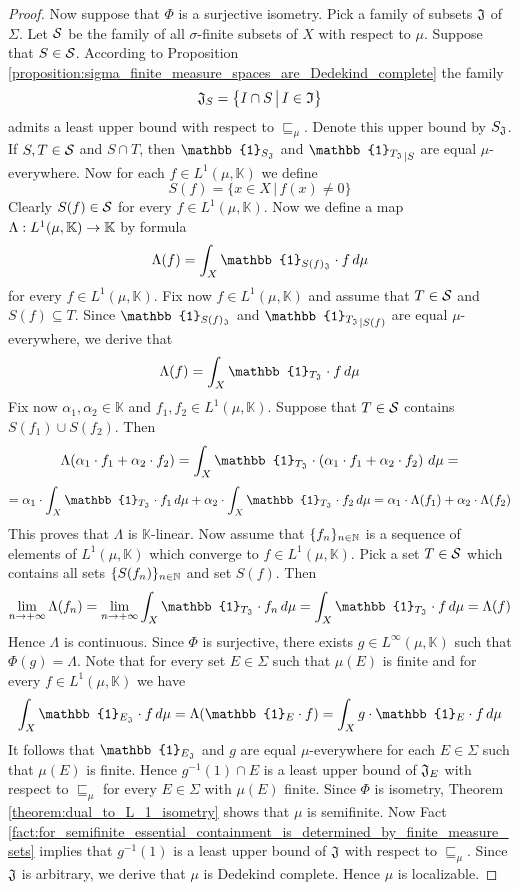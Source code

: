 \begin{proof}
  Now suppose that $\Phi$ is a surjective isometry. Pick a family of subsets ${\mathfrak J}$ of $\Sigma$. Let ${\mathcal S}$ be the family of all $\sigma$-finite subsets of $X$ with respect to $\mu$. Suppose that $S \in {\mathcal S}$. According to Proposition \ref{proposition:sigma_finite_measure_spaces_are_Dedekind_complete} the family
  $${\mathfrak J}_S = \big\{I\cap S\,\big|\,I\in {\mathfrak I}\big\}$$
  admits a least upper bound with respect to $\sqsubseteq_{\mu}$. Denote this upper bound by $S_{{\mathfrak J}}$. If $S,T \in {\mathcal S}$ and $S \cap T$, then $\mathbb{1}_{S_{\fJ}}$ and ${\mathbb{1}_{T_{\fJ}}}_{\mid S}$ are equal $\mu$-everywhere. Now for each $f \in L^1(\mu,\mathbb{K})$ we define
  $$S(f) = \big\{x\in X\,\big|\,f(x) \neq 0\big\}$$
  Clearly $S(f) \in {\mathcal S}$ for every $f \in L^1(\mu,\mathbb{K})$. Now we define a map $\Lambda:L^1(\mu,\mathbb{K})\rightarrow \mathbb{K}$ by formula
  $$\Lambda(f) = \int_X\mathbb{1}_{S(f)_{\fJ}}\cdot f\,d\mu$$
  for every $f \in L^1(\mu,\mathbb{K})$. Fix now $f \in L^1(\mu,\mathbb{K})$ and assume that $T \in {\mathcal S}$ and $S(f) \subseteq T$. Since $\mathbb{1}_{S(f)_{\fJ}}$ and ${\mathbb{1}_{T_{\fJ}}}_{\mid S(f)}$ are equal $\mu$-everywhere, we derive that
  $$\Lambda(f) = \int_X\mathbb{1}_{T_{\fJ}}\cdot f\,d\mu$$
  Fix now $\alpha_1,\alpha_2 \in \mathbb{K}$ and $f_1,f_2\in L^1(\mu,\mathbb{K})$. Suppose that $T \in {\mathcal S}$ contains $S(f_1)\cup S(f_2)$. Then 
  $$\Lambda(\alpha_1\cdot f_1 + \alpha_2\cdot f_2) = \int_X\mathbb{1}_{T_{\fJ}}\cdot \left(\alpha_1\cdot f_1 + \alpha_2\cdot f_2\right)\,d\mu = $$
  $$=\alpha_1\cdot \int_X \mathbb{1}_{T_{\fJ}}\cdot f_1\,d\mu + \alpha_2\cdot \int_X \mathbb{1}_{T_{\fJ}}\cdot f_2\,d\mu = \alpha_1\cdot \Lambda(f_1) + \alpha_2\cdot \Lambda(f_2)$$
  This proves that $\Lambda$ is $\mathbb{K}$-linear. Now assume that $\{f_n\}_{n\in {\mathbb N}}$ is a sequence of elements of $L^1(\mu,\mathbb{K})$ which converge to $f \in L^1(\mu,\mathbb{K})$. Pick a set $T \in {\mathcal S}$ which contains all sets $\{S(f_n)\}_{n \in {\mathbb N}}$ and set $S(f)$. Then
  $$\lim_{n\ra +\infty}\Lambda(f_n) = \lim_{n\ra +\infty}\int_X \mathbb{1}_{T_{\fJ}}\cdot f_n\,d\mu = \int_X \mathbb{1}_{T_{\fJ}}\cdot f\,d\mu = \Lambda(f)$$
  Hence $\Lambda$ is continuous. Since $\Phi$ is surjective, there exists $g \in L^{\infty}(\mu,\mathbb{K})$ such that $\Phi(g) = \Lambda$. Note that for every set $E \in \Sigma$ such that $\mu(E)$ is finite and for every $f \in L^1(\mu,\mathbb{K})$ we have
  $$\int_X\mathbb{1}_{E_{\fJ}}\cdot f\,d\mu= \Lambda(\mathbb{1}_E\cdot f) = \int_Xg\cdot \mathbb{1}_E\cdot f\,d\mu$$
  It follows that $\mathbb{1}_{E_{\fJ}}$ and $g$ are equal $\mu$-everywhere for each $E\in \Sigma$ such that $\mu(E)$ is finite. Hence $g^{-1}(1)\cap E$ is a least upper bound of ${\mathfrak J}_E$ with respect to $\sqsubseteq_{\mu}$ for every $E\in \Sigma$ with $\mu(E)$ finite. Since $\Phi$ is isometry, Theorem \ref{theorem:dual_to_L_1_isometry} shows that $\mu$ is semifinite. Now Fact \ref{fact:for_semifinite_essential_containment_is_determined_by_finite_measure_sets} implies that $g^{-1}(1)$ is a least upper bound of ${\mathfrak J}$ with respect to $\sqsubseteq_{\mu}$. Since ${\mathfrak J}$ is arbitrary, we derive that $\mu$ is Dedekind complete. Hence $\mu$ is localizable.
\end{proof}


